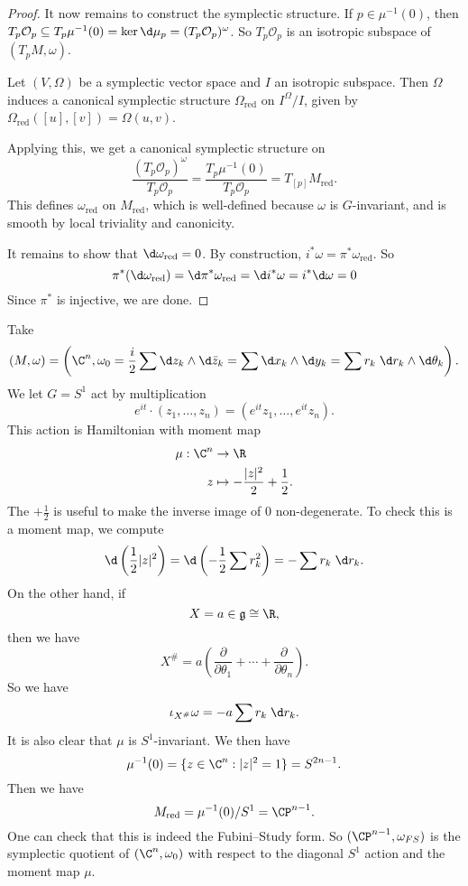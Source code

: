 \documentclass[a4paper]{article}
\newcommand\red{\mathrm{red}}
\begin{document}
\begin{proof}
  It now remains to construct the symplectic structure. If $p \in \mu^{-1}(0)$, then $T_p \mathcal{O}_p \subseteq T_p \mu^{-1}(0) = \ker \d \mu_p = (T_p \mathcal{O}_p)^\omega$. So $T_p \mathcal{O}_p$ is an isotropic subspace of $(T_p M, \omega)$.

  \begin{lemma}
    Let $(V, \Omega)$ be a symplectic vector space and $I$ an isotropic subspace. Then $\Omega$ induces a canonical symplectic structure $\Omega_{\red}$ on $I^\Omega/I$, given by $\Omega_{\red}([u], [v]) = \Omega(u, v)$.
  \end{lemma}

  Applying this, we get a canonical symplectic structure on
  \[
    \frac{(T_p\mathcal{O}_p)^\omega}{T_p \mathcal{O}_p} = \frac{T_p \mu^{-1}(0)}{T_p \mathcal{O}_p} = T_{[p]} M_{\red}.
  \]
  This defines $\omega_{\red}$ on $M_{\red}$, which is well-defined because $\omega$ is $G$-invariant, and is smooth by local triviality and canonicity.

  It remains to show that $\d \omega_{\red} = 0$. By construction, $i^* \omega = \pi^* \omega_{\red}$. So
  \[
    \pi^* (\d \omega_{\red}) = \d \pi^* \omega_{\red} = \d i^* \omega = i^* \d \omega = 0
  \]
  Since $\pi^*$ is injective, we are done.
\end{proof}

\begin{eg}
  Take
  \[
    (M, \omega) = \left(\C^n, \omega_0 = \frac{i}{2} \sum \d z_k \wedge \d \bar{z}_k = \sum \d x_k \wedge \d y_k = \sum r_k \;\d r_k \wedge \d \theta_k\right).
  \]
  We let $G = S^1$ act by multiplication
  \[
    e^{it} \cdot (z_1, \ldots, z_n) = (e^{it} z_1, \ldots, e^{it} z_n).
  \]
  This action is Hamiltonian with moment map
  \begin{align*}
    \mu: \C^n &\to \R\\
    z &\mapsto - \frac{|z|^2}{2} + \frac{1}{2}.
  \end{align*}
  The $+\frac{1}{2}$ is useful to make the inverse image of $0$ non-degenerate. To check this is a moment map, we compute
  \[
    \d \left(\frac{1}{2} |z|^2\right) = \d \left(-\frac{1}{2} \sum r_k^2\right) = - \sum r_k \;\d r_k.
  \]
  On the other hand, if
  \[
    X = a \in \mathfrak{g} \cong \R,
  \]
  then we have
  \[
    X^\# = a \left(\frac{\partial}{\partial \theta_1} + \cdots + \frac{\partial}{\partial \theta_n}\right).
  \]
  So we have
  \[
    \iota_{X^\#} \omega = - a \sum r_k \;\d r_k.
  \]
  It is also clear that $\mu$ is $S^1$-invariant. We then have
  \[
    \mu^{-1}(0) = \{z \in \C^n : |z|^2 = 1\} = S^{2n - 1}.
  \]
  Then we have
  \[
    M_{\red} = \mu^{-1}(0)/S^1 = \CP^{n - 1}.
  \]
  One can check that this is indeed the Fubini--Study form. So $(\CP^{n - 1}, \omega_{FS})$ is the symplectic quotient of $(\C^n, \omega_0)$ with respect to the diagonal $S^1$ action and the moment map $\mu$.
\end{eg}
\end{document}
